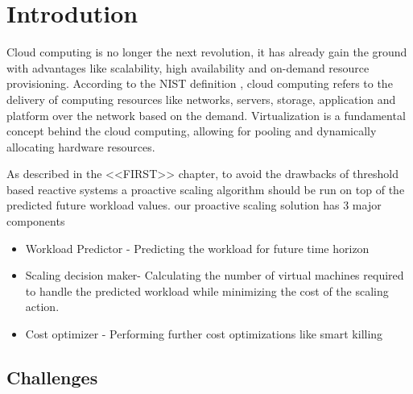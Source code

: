\section{Introdution}

Cloud computing is no longer the next revolution, it has already gain the ground with advantages like scalability, high availability and on-demand resource provisioning. According to the NIST definition \cite{Mell_2011} , cloud computing refers to the delivery of computing resources like networks, servers, storage, application and platform over the network based on the demand. 
Virtualization is a fundamental concept behind the  cloud computing, allowing for pooling and dynamically allocating hardware resources. 



As described in the <<FIRST>> chapter, to avoid the drawbacks of threshold based reactive systems a proactive scaling algorithm should be run on top of the predicted future workload values. our proactive scaling solution has 3 major components

\begin{itemize}
\item Workload Predictor - Predicting the workload for future time horizon
\end{itemize}

\begin{itemize}
\item Scaling decision maker- Calculating the number of virtual machines required to handle the predicted workload while minimizing the cost of the scaling action.
\end{itemize}

\begin{itemize}
\item Cost optimizer - Performing further cost optimizations like smart killing
\end{itemize}

\usepackage{multirow}


\subsection{Challenges}

